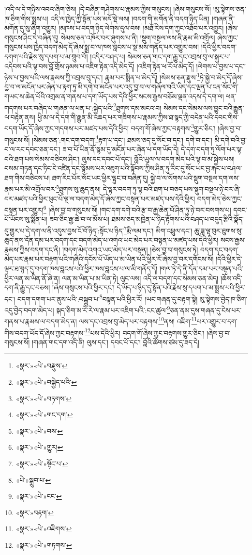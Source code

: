 །འདི་ལ་དེ་གཉིས་འབའ་ཞིག་ཅེས། །དེ་བཞིན་གཤེགས་པ་རྣམས་ཀྱིས་གསུངས། །ཞེས་གསུངས་སོ། །མུ་སྟེགས་ཅན་ཁ་ཅིག་གིས་སྨྲས་པ། འདི་ལ་ཁྱེད་ཀྱི་སྟོན་པས་མདོ་སྡེ་ལས། །བདག་གི་མགོན་ནི་བདག་ཉིད་ཡིན། །གཞན་ནི་མགོན་དུ་སུ་ཞིག་འགྱུར། །མཁས་པ་བདག་ཉིད་ལེགས་དུལ་བས། །མཐོ་རིས་དག་ཀྱང་འཐོབ་པར་འགྱུར། །ཞེས་གསུངས་ཤིང་དེ་བཞིན་དུ། སེམས་ཅན་འཁོར་བར་ཞུགས་པ་ནི། །སྡུག་བསྔལ་ལས་ནི་རྣམ་མི་འགྲོལ། ཞེས་ཀྱང་གསུངས་པས་ཁྱེད་བདག་མེད་དོ་ཞེས་སྨྲ་བ་ལ་ཁས་བླངས་པ་སྔ་མས་གནོད་པར་འགྱུར་བས། །དེའི་ཕྱིར་བདག་དགག་པའི་རྗེས་སུ་དཔག་པ་མ་གྲུབ་བོ། །འདིར་བཤད་པ། སེམས་ཅན་གང་དག་རྒྱུ་དང་འབྲས་བུ་ལ་སྐུར་པ་འདེབས་པའི་ལྟ་བས་བློ་གྲོས་ཉམས་པ་འཇིག་རྟེན་འདི་མེད་དོ། །འཇིག་རྟེན་ཕ་རོལ་མེད་དོ། །ལེགས་པ་བྱས་པ་དང་། ཉེས་པ་བྱས་པའི་ལས་རྣམས་ཀྱི་འབྲས་བུ་དང་། རྣམ་པར་སྨིན་པ་མེད་དོ། །སེམས་ཅན་རྫུས་\footnote{«སྣར་»«པེ་»བརྫུས་}ཏེ་སྐྱེ་བ་མེད་དོ་ཞེས་བྱ་བ་ལ་མངོན་པར་ཞེན་པ་རྟག་ཏུ་མི་དགེ་བ་མངོན་པར་འདུ་བྱ་བ་ལ་གཞོལ་བའི་ཡིད་དང་ལྡན་པ་ངན་སོང་གི་གཡང་ས་ཆེན་པོའི་འགྲམ་ན་གནས་པ་དག་ཡོད་པས་དེའི་ཕྱིར་སངས་རྒྱས་བཅོམ་ལྡན་འདས་དེ་དག་ལ། ཕན་གདགས་པར་བཞེད་པ་གཞན་ལ་ཕན་པ་:སྐྱེད་པའི་\footnote{«སྣར་»«པེ་»བསྐྱེད་པའི་}ཐུགས་དམ་མངའ་བ། སེམས་དང་སེམས་ལས་བྱུང་བའི་རྒྱུན་ལ་བརྟེན་ནས། ཕྱི་མ་ལ་དེ་དག་གི་རྒྱུན་མི་འཆད་པར་གཟིགས་པ་རྣམས་ཀྱིས་ཐ་སྙད་ཀྱི་བདེན་པའི་དབང་གིས་བདག་ཡོད་དོ་ཞེས་ཀྱང་གདགས་པར་མཛད་པས་དེའི་ཕྱིར། བདག་གོ་ཞེས་ཀྱང་བརྟགས་\footnote{«སྣར་»«པེ་»བཏགས་}གྱུར་ཅིང་། །ཞེས་བྱ་བ་གསུངས་སོ། །སེམས་ཅན་:གང་དག་བདག་\footnote{«སྣར་»«པེ་»གང་དག་}རྟག་པ་དང་། ཐམས་ཅད་དུ་སོང་བ་དང་། དགེ་བ་དང་། མི་དགེ་བའི་བྱ་བ་ལ་རང་དབང་ཅན་དང་། ཟ་བ་པོ་ཡིན་ནོ་སྙམ་དུ་མངོན་པར་ཞེན་པ་དག་ཡོད་དེ། དེ་དག་བདག་ཏུ་ལོག་པར་ལྟ་བའི་ཐག་པས་སེམས་བཅིངས་ཤིང་། ལུས་དང་དབང་པོ་དང་། བློའི་ཡུལ་ལ་བདག་མེད་པའི་ལྟ་བ་མ་སྐྱེས་པས། བསམ་གཏན་དང་ཏིང་ངེ་འཛིན་དང་སྙོམས་པར་འཇུག་པའི་སྟོབས་ཀྱིས་ཤིན་ཏུ་རིང་དུ་སོང་ཡང་བྱ་རྐང་པ་བཤལ་ཐག་གིས་བཅིངས་པ། ཐག་རིང་པོར་སོང་ཡང་ཕྱིར་ལྟུང་བ་བཞིན་དུ། སྐྱེ་བ་ལ་སོགས་པའི་སྡུག་བསྔལ་དག་ལས་རྣམ་པར་མི་འགྲོལ་བར་\footnote{«སྣར་»«པེ་»བས་}ཐུགས་སུ་ཆུད་ནས། དེ་ལྟར་བདག་ཏུ་ལྟ་བའི་ཐག་པ་བཅད་པས་སྡུག་བསྔལ་ཉེ་བར་ཞི་བར་མཛད་པའི་ཕྱིར་ཕུང་པོ་ལྔ་ལ་བདག་མེད་དོ་ཞེས་ཀྱང་བསྟན་པར་མཛད་པས་དེའི་ཕྱིར། བདག་མེད་ཅེས་ཀྱང་བསྟན་པར་འགྱུར།\footnote{«སྣར་»«པེ་»གྱུར།} །ཞེས་བྱ་བ་གསུངས་སོ། །གང་དག་དགེ་བའི་རྩ་བ་རྒྱ་ཆེན་པོ་ཤིན་ཏུ་ཉེ་བར་བསགས་པ། དབང་པོ་ཡོངས་སུ་སྨིན་པ། ཟབ་ཅིང་རྒྱ་ཆེ་བ་ལ་མོས་པ། ཐམས་ཅད་མཁྱེན་པ་ཉིད་རྟོགས་པའི་བཤད་པ་བདུད་རྩིའི་སྣོད་དུ་གྱུར་པ་དེ་དག་ལ་ནི་འདུས་བྱས་ངོ་བོ་ཉིད་:སྟོང་པ་ཉིད་\footnote{«སྣར་»«པེ་»སྟོང་པ་}རྨི་ལམ་དང་། མིག་འཕྲུལ་དང་། ཆུ་ཟླ་ལྟ་བུར་ཐུགས་སུ་ཆུད་ནས་དོན་དམ་པར་བདག་དང་བདག་མེད་པ་འགའ་ཡང་མེད་པར་བསྟན་པ་མཛད་པས་དེའི་ཕྱིར། སངས་རྒྱས་རྣམས་ཀྱིས་བདག་དང་ནི། །བདག་མེད་འགའ་ཡང་མེད་པར་བསྟན། །ཅེས་བྱ་བ་གསུངས་ཏེ། བདག་དང་བདག་མེད་པར་རྣམ་པར་བརྟག་པའི་གཞིའི་དངོས་པོ་ཡོད་པ་མ་ཡིན་པའི་ཕྱིར་རོ་ཞེས་བྱ་བར་དགོངས་སོ། །དེའི་ཕྱིར་དེ་ལྟར་ཐ་སྙད་དུ་བདག་ཁས་བླངས་པའི་ཕྱིར་ཁས་བླངས་པ་ལ་མི་གནོད་དོ། །གལ་ཏེ་དེ་ནི་དོན་དམ་པར་བསྟན་པའི་ཕྱིར་ལན་མ་ཡིན་ནོ་ཞེ་ན། ལན་མ་ཡིན་པ་མ་ཡིན་ཏེ། ལུང་ལས། འདི་ལ་བདག་དང་སེམས་ཅན་མེད། །ཆོས་འདི་དག་ནི་རྒྱུ་དང་བཅས། །ཞེས་གསུངས་པའི་ཕྱིར་དང་། དེ་ཡོད་པ་ཉིད་དུ་སྟོན་པའི་རྗེས་སུ་དཔག་པ་མ་སྨྲས་པའི་ཕྱིར་དང་། བདག་དགག་པར་ནུས་པའི་:བསྒྲུབ་པ་\footnote{«པེ་»སྒྲུབ་པ་}བསྟན་པའི་ཕྱིར་རོ། །ཡང་གཞན་དུ་བརྟག་སྟེ། མུ་སྟེགས་བྱེད་ཁ་ཅིག་འདུ་བྱེད་བདག་མེད་པ། སྐད་ཅིག་མ་རེ་རེ་ལ་རྣམ་པར་འཇིག་པའི་:ངང་ཚུལ་\footnote{«སྣར་»«པེ་»ངང་}ཅན་ནམ་དུས་གཞན་དུ་ངེས་པར་གནས་པ་རྣམས་ལ་བདག་མེད་ན། ལས་དང་འབྲས་བུ་མེད་པར་བརྟགས་\footnote{«སྣར་»བརྟག་}ནས། འཇིག་\footnote{«སྣར་»«པེ་»འཇིགས་}པར་འགྱུར་བ་དག་གིས་བདག་ཡོད་དོ་ཞེས་ཀྱང་བརྟགས་\footnote{«སྣར་»«པེ་»གཏགས་}པས་དེའི་ཕྱིར། བདག་གོ་ཞེས་ཀྱང་བརྟགས་གྱུར་ཅིང་། །ཞེས་བྱ་བ་གསུངས་སོ། །གཞན་གང་དག་འདི་ནི། ལུས་དང་། དབང་པོ་དང་། བློའི་ཚོགས་ཙམ་དུ་ཟད་དེ། 